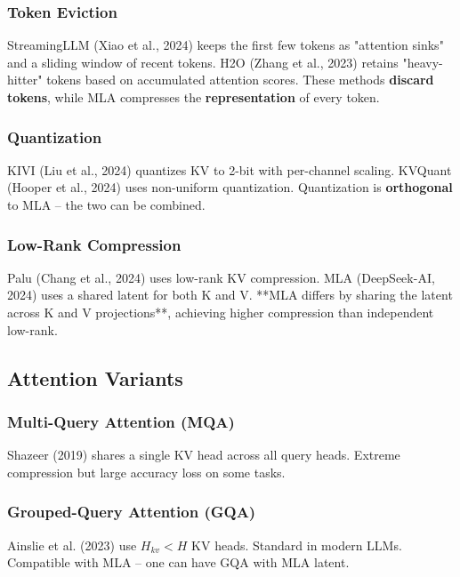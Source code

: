 \subsubsection{Token Eviction}

StreamingLLM (Xiao et al., 2024) keeps the first few tokens as "attention 
sinks" and a sliding window of recent tokens. H2O (Zhang et al., 2023) 
retains "heavy-hitter" tokens based on accumulated attention scores. These 
methods \textbf{discard tokens}, while MLA compresses the \textbf{representation} of 
every token.

\subsubsection{Quantization}

KIVI (Liu et al., 2024) quantizes KV to 2-bit with per-channel scaling. 
KVQuant (Hooper et al., 2024) uses non-uniform quantization. Quantization is 
\textbf{orthogonal} to MLA -- the two can be combined.

\subsubsection{Low-Rank Compression}

Palu (Chang et al., 2024) uses low-rank KV compression. MLA (DeepSeek-AI, 
2024) uses a shared latent for both K and V. **MLA differs by sharing the 
latent across K and V projections**, achieving higher compression than 
independent low-rank.

\subsection{Attention Variants}

\subsubsection{Multi-Query Attention (MQA)}

Shazeer (2019) shares a single KV head across all query heads. Extreme 
compression but large accuracy loss on some tasks.

\subsubsection{Grouped-Query Attention (GQA)}

Ainslie et al. (2023) use $H_{kv} < H$ KV heads. Standard in modern 
LLMs. Compatible with MLA -- one can have GQA with MLA latent.

